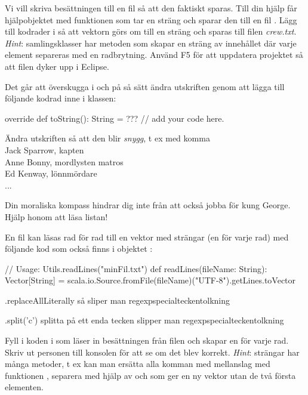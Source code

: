\Subtask Vi vill skriva besättningen till en fil så att den faktiskt sparas. Till din hjälp får hjälpobjektet  med funktionen  som tar en sträng  och sparar den till en fil . Lägg till kodrader i  så att vektorn görs om till en sträng och sparas till filen \emph{crew.txt}. \emph{Hint}: samlingsklasser har metoden  som skapar en sträng av innehållet där varje element separeras med en radbrytning. Använd F5 för att uppdatera projektet så att filen dyker upp i Eclipse.



\Subtask Det går att överskugga  i  och på så sätt ändra utskriften genom att lägga till följande kodrad inne i klassen: 
\begin{Code}
override def toString(): String = ??? // add your code here. 
\end{Code}

\noindent Ändra utskriften så att den blir {\em snygg}, t ex med komma\\ 

\noindent Jack Sparrow, kapten \\
Anne Bonny, mordlysten matros \\
Ed Kenway, lönnmördare \\
... 

{}

\Subtask Din moraliska kompass hindrar dig inte från att också jobba för kung George. Hjälp honom att läsa listan!

En fil  kan läsas rad för rad till en vektor med strängar (en för varje rad) med följande kod som också finns i objektet : 

\begin{CodeSmall}
// Usage: Utils.readLines("minFil.txt")
def readLines(fileName: String): Vector[String] = {
			scala.io.Source.fromFile(fileName)("UTF-8").getLines.toVector
	}
\end{CodeSmall}

\TODO .replaceAllLiterally så sliper man regexpspecialteckentolkning

\TODO .split('c')  splitta på ett enda tecken slipper man regexpspecialteckentolkning

Fyll i koden i  som läser in besättningen från filen och skapar en  för varje rad. Skriv ut personen till konsolen för att se om det blev korrekt. \emph{Hint}: strängar har många metoder, t ex kan man ersätta alla komman med mellanslag med funktionen , separera med hjälp av  och  som ger en ny vektor utan de två första elementen.

